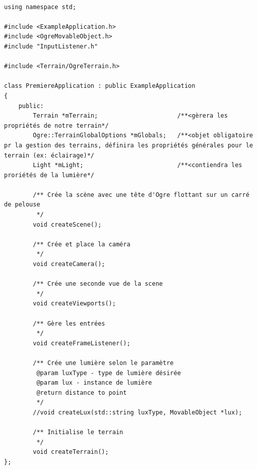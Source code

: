 \begin{lstlisting}[caption={PremiereApplication.h}]

using namespace std;

#include <ExampleApplication.h>
#include <OgreMovableObject.h>
#include "InputListener.h"

#include <Terrain/OgreTerrain.h>

class PremiereApplication : public ExampleApplication
{    
    public:
        Terrain *mTerrain;                      /**<gèrera les propriétés de notre terrain*/
        Ogre::TerrainGlobalOptions *mGlobals;   /**<objet obligatoire pr la gestion des terrains, définira les propriétés générales pour le terrain (ex: éclairage)*/
        Light *mLight;                          /**<contiendra les proriétés de la lumière*/
        
        /** Crée la scène avec une tête d'Ogre flottant sur un carré de pelouse
         */
        void createScene();
        
        /** Crée et place la caméra
         */
        void createCamera();
        
        /** Crée une seconde vue de la scene
         */
        void createViewports();

        /** Gère les entrées 
         */
        void createFrameListener();
        
        /** Crée une lumière selon le paramètre
         @param luxType - type de lumière désirée 
         @param lux - instance de lumière 
         @return distance to point
         */
        //void createLux(std::string luxType, MovableObject *lux);
        
        /** Initialise le terrain
         */
        void createTerrain();
};
\end{lstlisting}













